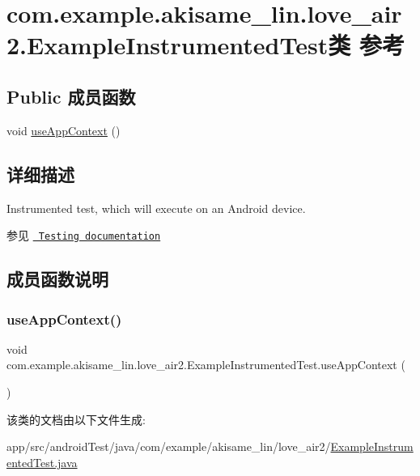 \hypertarget{classcom_1_1example_1_1akisame__lin_1_1love__air2_1_1_example_instrumented_test}{}\section{com.\+example.\+akisame\+\_\+lin.\+love\+\_\+air2.\+Example\+Instrumented\+Test类 参考}
\label{classcom_1_1example_1_1akisame__lin_1_1love__air2_1_1_example_instrumented_test}
\subsection*{Public 成员函数}
\begin{DoxyCompactItemize}
\item 
void \mbox{\hyperlink{classcom_1_1example_1_1akisame__lin_1_1love__air2_1_1_example_instrumented_test_a63c73d8c8f4565ed6e7d0032597963fe}{use\+App\+Context}} ()
\end{DoxyCompactItemize}


\subsection{详细描述}
Instrumented test, which will execute on an Android device.

\begin{DoxySeeAlso}{参见}
\href{http://d.android.com/tools/testing}{\texttt{ Testing documentation}} 
\end{DoxySeeAlso}


\subsection{成员函数说明}
\mbox{\label{classcom_1_1example_1_1akisame__lin_1_1love__air2_1_1_example_instrumented_test_a63c73d8c8f4565ed6e7d0032597963fe}} 
\subsubsection{\texorpdfstring{useAppContext()}{useAppContext()}}
{\footnotesize\ttfamily void com.\+example.\+akisame\+\_\+lin.\+love\+\_\+air2.\+Example\+Instrumented\+Test.\+use\+App\+Context (\begin{DoxyParamCaption}{ }\end{DoxyParamCaption})\hspace{0.3cm}{\ttfamily [inline]}}



该类的文档由以下文件生成\+:\begin{DoxyCompactItemize}
\item 
app/src/android\+Test/java/com/example/akisame\+\_\+lin/love\+\_\+air2/\mbox{\hyperlink{_example_instrumented_test_8java}{Example\+Instrumented\+Test.\+java}}\end{DoxyCompactItemize}
